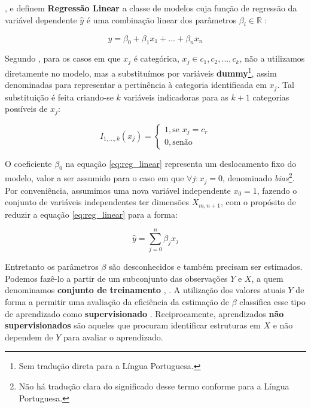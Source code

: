 \cite[p.44]{Hastie},\cite[p.138]{Bishop} e \cite[p.127]{Murphy} definem \textbf{Regressão Linear} a classe de modelos cuja função de regressão da variável dependente $ \hat{y} $ é uma combinação linear dos parâmetros $ \beta_i \in \mathbb{R} $ :

\begin{equation}\label{eq:reg_linear}
\hat{y} = \beta_0 + \beta_1x_1 + ... + \beta_nx_n
\end{equation}

Segundo \cite[9-11]{Andersen}, para os casos em que $ x_j $ é categórica, $ x_j \in {c_1,c_2,...,c_k} $, não a utilizamos diretamente no modelo, mas a substituímos por variáveis \textbf{dummy}\footnote{Sem tradução direta para a Língua Portuguesa.}, assim denominadas para representar a pertinência à categoria identificada em  $ x_j $. Tal substituição é feita criando-se $ k $ variáveis indicadoras para as $ k+1 $ categorias possíveis de $ x_j $:

\begin{equation}
I_{1,...,k}(x_j)=
	\begin{cases}
		1, \text{se }x_j = c_r \\
		0, \text{senão}
	\end{cases}
\end{equation}



O coeficiente $ \beta_0 $ na equação \ref{eq:reg_linear} representa um deslocamento fixo do modelo, valor a ser assumido para o caso em que $ \forall j: x_j = 0 $, denominado  \textit{bias}\footnote{Não há tradução clara do significado desse termo conforme \cite[p.138]{Bishop} para a Língua Portuguesa.}. Por conveniência, assumimos uma nova variável independente $ x_0=1 $, fazendo o conjunto de variáveis independentes ter dimensões $ X_{m,n+1} $, com o propósito de reduzir a equação \ref{eq:reg_linear} para a forma:

\begin{equation}\label{eq:reg_linear_bishop}
\hat{y} = \sum_{j=0}^{n}\beta_j x_j
\end{equation}

Entretanto os parâmetros $ \beta $ são desconhecidos e também precisam ser estimados. Podemos fazê-lo a partir de um subconjunto das observações $ Y $ e $ X $, a quem denominamos \textbf{conjunto de treinamento} \cite[p.4]{Bishop}, \cite[p.1]{Hastie}. A utilização dos valores atuais $ Y $ de forma a permitir uma avaliação da eficiência da estimação de $ \beta $ classifica esse tipo de aprendizado como \textbf{supervisionado} \cite[p.2]{Hastie}. Reciprocamente, aprendizados \textbf{não supervisionados} são aqueles que procuram identificar estruturas em $ X $ e não dependem de $ Y $ para avaliar o aprendizado.


